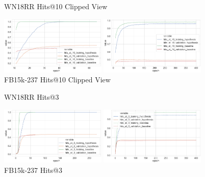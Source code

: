 \begin{figure}[H]
	\parbox{.5\linewidth}{
   		\caption{WN18RR Hits@10 Clipped View}
   		\centering
    		\includegraphics[width=0.45\textwidth, height=0.2\textheight]{WN18RR_hits_at_10_Results_Clipped}
		}
	\hfill
	\parbox{.5\linewidth}{
		\caption{FB15k-237 Hits@10  Clipped View}
   		\centering
		\includegraphics[width=0.45\textwidth, height=0.2\textheight]{FB15k-237_hits_at_10_Results_Clipped}
		}
\end{figure}


\begin{figure}[H]
	\parbox{.5\linewidth}{
   		\caption{WN18RR Hits@3}
   		\centering
    		\includegraphics[width=0.45\textwidth, height=0.2\textheight]{WN18RR_hits_at_3_Results}
		}
	\hfill
	\parbox{.5\linewidth}{
		\caption{FB15k-237 Hits@3}
   		\centering
		\includegraphics[width=0.45\textwidth, height=0.2\textheight]{FB15k-237_hits_at_3_Results}
		}
\end{figure}

